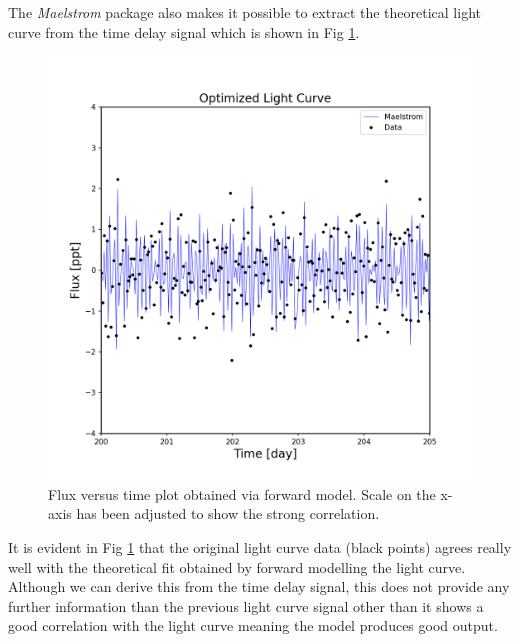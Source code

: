 \documentclass[]{article}
\begin{document}
The \textit{Maelstrom} package also makes it possible to extract the theoretical light curve from the time delay signal which is shown in Fig \ref{fig:LightcurveOptimized}.
\begin{figure}[H]
    \centering
    \includegraphics[width=1\linewidth]{lightcurve_opt.png}
      \caption{Flux versus time plot obtained via forward model. Scale on the x-axis has been adjusted to show the strong correlation.}
      \label{fig:LightcurveOptimized}
\end{figure}

It is evident in Fig \ref{fig:LightcurveOptimized} that the original light curve data (black points) agrees really well with the theoretical fit obtained by forward modelling the light curve.
Although we can derive this from the time delay signal, this does not provide any further information than the previous light curve signal other than it shows a good correlation with the light curve meaning the model produces good output.
\end{document}
